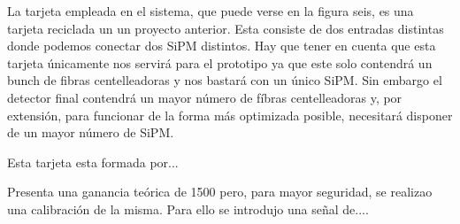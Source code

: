 La tarjeta empleada en el sistema, que puede verse en la figura seis, es una tarjeta reciclada un un proyecto anterior. Esta consiste de dos entradas distintas donde podemos conectar dos SiPM distintos. Hay que tener en cuenta que esta tarjeta únicamente nos servirá para el prototipo ya que este solo contendrá un bunch de fibras centelleadoras y nos bastará con un único SiPM. Sin embargo el detector final contendrá un mayor número de fíbras centelleadoras y, por extensión, para funcionar de la forma más optimizada posible, necesitará disponer de un mayor número de SiPM.

Esta tarjeta esta formada por...%

Presenta una ganancia teórica de 1500 pero, para mayor seguridad, se realizao una calibración de la misma. Para ello se introdujo una señal de....	
